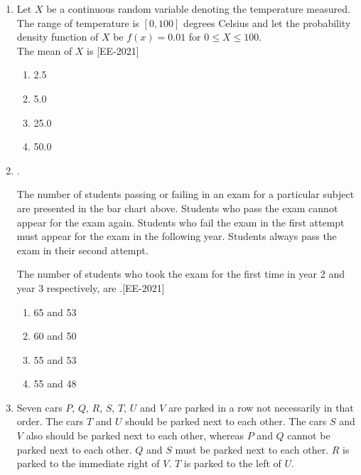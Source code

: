 \documentclass[journal]{IEEEtran}
\begin{document}
\begin{enumerate}
    \item Let $X$ be a continuous random variable denoting the temperature measured. The range of temperature is $[0, 100]$ degrees Celsius and let the probability density function of $X$ be $f(x) = 0.01$ for $0 \leq X \leq 100$.\\
    The mean of $X$ is \underline{\hspace{2cm}} \hfill{[EE-2021]}
    \begin{enumerate}
        \item 2.5
        \item 5.0
        \item 25.0
        \item 50.0
    \end{enumerate}

    \item. \begin{figure}[H]
        \centering
        
   
   \end{figure}
    The number of students passing or failing in an exam for a particular subject are presented in the bar chart above. Students who pass the exam cannot appear for the exam again. Students who fail the exam in the first attempt must appear for the exam in the following year. Students always pass the exam in their second attempt.

The number of students who took the exam for the first time in year 2 and year 3 respectively, are \underline{\hspace{2cm}}.\hfill{[EE-2021]}
    \begin{enumerate}
        \item  65 and 53
        \item  60 and 50
        \item  55 and 53
        \item  55 and 48
    \end{enumerate}

\item Seven cars $P$, $Q$, $R$, $S$, $T$, $U$ and $V$ are parked in a row not necessarily in that order. The cars $T$ and $U$ should be parked next to each other. The cars $S$ and $V$ also should be parked next to each other, whereas $P$ and $Q$ cannot be parked next to each other. $Q$ and $S$ must be parked next to each other. $R$ is parked to the immediate right of $V$. $T$ is parked to the left of $U$.


\end{enumerate}
\end{document}
